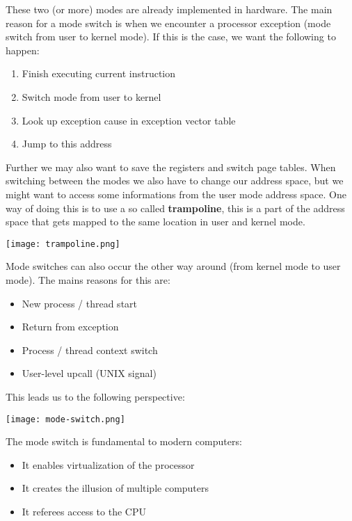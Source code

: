 These two (or more) modes are already implemented in hardware. The main reason for a mode switch is when we encounter a processor exception (mode switch from user to kernel mode). If this is the case, we want the following to happen:

\begin{enumerate}
	\item Finish executing current instruction
	\item Switch mode from user to kernel
	\item Look up exception cause in exception vector table
	\item Jump to this address
\end{enumerate}

Further we may also want to save the registers and switch page tables. When switching between the modes we also have to change our address space, but we might want to access some informations from the user mode address space. One way of doing this is to use a so called \textbf{trampoline}, this is a part of the address space that gets mapped to the same location in user and kernel mode.

\begin{center}
	\texttt{[image: trampoline.png]}
\end{center}

Mode switches can also occur the other way around (from kernel mode to user mode). The mains reasons for this are:

\begin{itemize}
	\item New process / thread start
	\item Return from exception
	\item Process / thread context switch
	\item User-level upcall (UNIX signal)
\end{itemize}

This leads us to the following perspective:

\begin{center}
	\texttt{[image: mode-switch.png]}
\end{center}

The mode switch is fundamental to modern computers:

\begin{itemize}
	\item It enables virtualization of the processor
	\item It creates the illusion of multiple computers
	\item It referees access to the CPU
\end{itemize}


